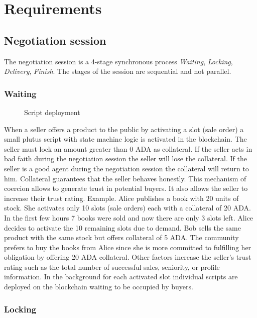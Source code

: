 \documentclass[12pt]{article}
\begin{document}
\section{ Requirements }

\subsection { Negotiation session }

The negotiation session is a 4-stage synchronous process \emph{Waiting}, \emph{Locking}, \emph{Delivery}, \emph{Finish}. The stages of the session are sequential and not parallel.

\subsubsection { Waiting }

\begin{figure}[ht]
  \centering
  
  \caption{Script deployment}
  \label{fig:mi_imagen}
\end{figure}


When a seller offers a product to the public by activating a slot (sale order) a small plutus script with state machine logic is activated in the blockchain.
The seller must lock an amount greater than 0 ADA as collateral. 
If the seller acts in bad faith during the negotiation session the seller will lose the collateral.
If the seller is a good agent during the negotiation session the collateral will return to him.
Collateral guarantees that the seller behaves honestly.
This mechanism of coercion allows to generate trust in potential buyers. 
It also allows the seller to increase their trust rating. Example. Alice publishes a book with 20 units of stock.
She activates only 10 slots (sale orders) each with a collateral of 20 ADA.
In the first few hours 7 books were sold and now there are only 3 slots left.
Alice decides to activate the 10 remaining slots due to demand.
Bob sells the same product with the same stock but offers collateral of 5 ADA. The community prefers to buy the books from Alice since she is more committed to fulfilling her obligation by offering 20 ADA collateral.
Other factors increase the seller's trust rating such as the total number of successful sales, seniority, or profile information.
In the background for each activated slot individual scripts are deployed on the blockchain waiting to be occupied by buyers.

\subsubsection { Locking }
\end{document}
